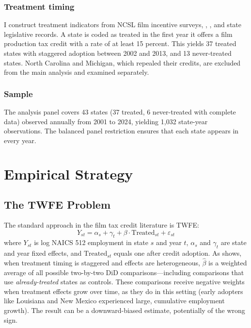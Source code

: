 \documentclass[12pt]{article}
\begin{document}
\subsubsection*{Treatment timing} I construct treatment indicators from NCSL film incentive surveys, \citet{button2019producers}, \citet{thom2018green}, and state legislative records. A state is coded as treated in the first year it offers a film production tax credit with a rate of at least 15 percent. This yields 37 treated states with staggered adoption between 2002 and 2013, and 13 never-treated states. North Carolina and Michigan, which repealed their credits, are excluded from the main analysis and examined separately.

\subsubsection*{Sample} The analysis panel covers 43 states (37 treated, 6 never-treated with complete data) observed annually from 2001 to 2024, yielding 1,032 state-year observations. The balanced panel restriction ensures that each state appears in every year.




\section{Empirical Strategy}
\label{sec:strategy}

\subsection{The TWFE Problem}

The standard approach in the film tax credit literature is TWFE:
\begin{equation}
Y_{st} = \alpha_s + \gamma_t + \beta \cdot \text{Treated}_{st} + \varepsilon_{st}
\label{eq:twfe}
\end{equation}
where $Y_{st}$ is log NAICS 512 employment in state $s$ and year $t$, $\alpha_s$ and $\gamma_t$ are state and year fixed effects, and $\text{Treated}_{st}$ equals one after credit adoption. As \citet{goodman2021difference} shows, when treatment timing is staggered and effects are heterogeneous, $\hat{\beta}$ is a weighted average of all possible two-by-two DiD comparisons---including comparisons that use \emph{already-treated} states as controls. These comparisons receive negative weights when treatment effects grow over time, as they do in this setting (early adopters like Louisiana and New Mexico experienced large, cumulative employment growth). The result can be a downward-biased estimate, potentially of the wrong sign.
\end{document}
